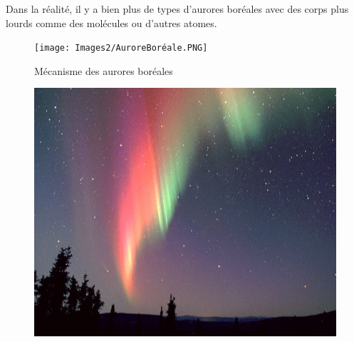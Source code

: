 Dans la réalité, il y a bien plus de types d'aurores boréales avec des corps plus lourds comme des molécules ou d'autres atomes.\\

\begin{figure}[htp]
    \centering
    \texttt{[image: Images2/AuroreBoréale.PNG]}
    \caption{Mécanisme des aurores boréales}
    \label{fig:meca_aurores_boreales}
\end{figure}
\begin{figure}[htp]
    \centering
    \includegraphics[scale=0.6]{Images2/photoAurore.jpg}
\end{figure}

